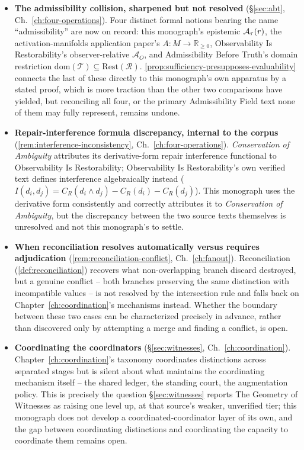 \begin{itemize}
  \item \textbf{The admissibility collision, sharpened but not resolved}
  (\S\ref{sec:abt}, Ch.~\ref{ch:four-operations}). Four distinct formal
  notions bearing the name ``admissibility'' are now on record: this
  monograph's epistemic $\mathcal{A}_{\tau}(r)$, the activation-manifolds
  application paper's $A: M \to \mathbb{R}_{\ge 0}$, Observability Is
  Restorability's observer-relative $\mathcal{A}_O$, and Admissibility
  Before Truth's domain restriction $\mathrm{dom}(\mathcal{T}) \subseteq
  \mathrm{Rest}(\mathcal{R})$. \cref{prop:sufficiency-presupposes-evaluability}
  connects the last of these directly to this monograph's own apparatus by
  a stated proof, which is more traction than the other two comparisons
  have yielded, but reconciling all four, or the primary Admissibility
  Field text none of them may fully represent, remains undone.

  \item \textbf{Repair-interference formula discrepancy, internal to the
  corpus} (\cref{rem:interference-inconsistency}, Ch.~\ref{ch:four-operations}).
  \emph{Conservation of Ambiguity} attributes its derivative-form repair
  interference functional to Observability Is Restorability; Observability
  Is Restorability's own verified text defines interference algebraically
  instead ($I(d_i,d_j) = C_R(d_i \wedge d_j) - C_R(d_i) - C_R(d_j)$). This
  monograph uses the derivative form consistently and correctly attributes
  it to \emph{Conservation of Ambiguity}, but the discrepancy between the
  two source texts themselves is unresolved and not this monograph's to
  settle.

  \item \textbf{When reconciliation resolves automatically versus requires
  adjudication} (\cref{rem:reconciliation-conflict}, Ch.~\ref{ch:fanout}).
  Reconciliation (\cref{def:reconciliation}) recovers what non-overlapping
  branch discard destroyed, but a genuine conflict -- both branches
  preserving the same distinction with incompatible values -- is not
  resolved by the intersection rule and falls back on
  Chapter~\ref{ch:coordination}'s mechanisms instead. Whether the boundary
  between these two cases can be characterized precisely in advance,
  rather than discovered only by attempting a merge and finding a
  conflict, is open.

  \item \textbf{Coordinating the coordinators} (\S\ref{sec:witnesses},
  Ch.~\ref{ch:coordination}). Chapter~\ref{ch:coordination}'s taxonomy
  coordinates distinctions across separated stages but is silent about
  what maintains the coordinating mechanism itself -- the shared ledger,
  the standing court, the augmentation policy. This is precisely the
  question \S\ref{sec:witnesses} reports The Geometry of Witnesses as
  raising one level up, at that source's weaker, unverified tier; this
  monograph does not develop a coordinated-coordinator layer of its own,
  and the gap between coordinating distinctions and coordinating the
  capacity to coordinate them remains open.
\end{itemize}
